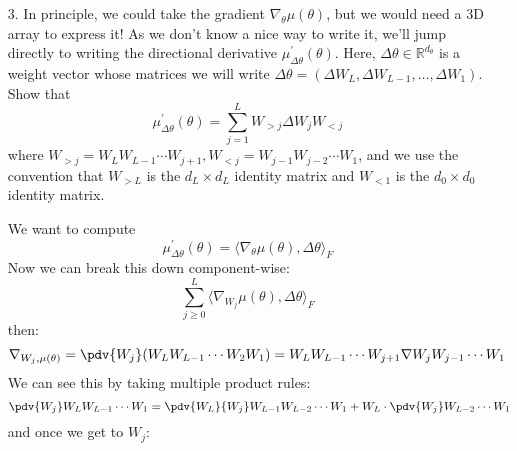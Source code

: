 \documentclass{article}
\begin{document}
\begin{itemize}
                \item [3.] In principle, we could take the gradient $\nabla_{\theta} \mu(\theta)$, but we would need a $3$D array to express it! As we don't know a nice way to write it, we'll jump directly to writing the directional derivative $\mu^{\prime}_{\Delta \theta}(\theta)$. Here, $\Delta\theta \in \mathbb{R}^{d_{\theta}}$ is a weight vector whose matrices we will write $\Delta\theta = (\Delta W_{L}, \Delta W_{L - 1}, \ldots, \Delta W_{1})$. Show that
                    \begin{equation*}
                        \mu^{\prime}_{\Delta\theta}(\theta) = \sum_{j = 1}^{L}W_{ > j} \Delta W_{j}W_{ < j}
                    \end{equation*}
                where $W_{> j} = W_{L}W_{L - 1} \cdots W_{j + 1}, W_{< j} = W_{j - 1}W_{j - 2} \cdots W_{1}$, and we use the convention that $W_{ > L}$ is the $d_{L} \times d_{L}$ identity matrix and $W_{ < 1}$ is the $d_{0} \times d_{0}$ identity matrix.
                    \begin{answer}
                        We want to compute
                            \begin{equation*}
                                \mu^{\prime}_{\Delta\theta}(\theta) = \langle \nabla_{\theta}\mu(\theta), \Delta \theta \rangle_{F}
                            \end{equation*}
                        Now we can break this down component-wise:
                            \begin{equation*}
                                \sum_{j \geq 0}^{L} \langle \nabla_{W_{j}}\mu(\theta), \Delta\theta \rangle_{F}
                            \end{equation*}
                        then:
                            \begin{equation*}
                                \nabla_{W_{j}, \mu(\theta)} = \pdv{W_{j}}(W_{L}W_{L - 1} \cdots W_{2} W_{1}) = W_{L}W_{L - 1} \cdots W_{j + 1} \nabla W_{j} W_{j - 1}\cdots W_{1}
                            \end{equation*}
                        We can see this by taking multiple product rules:
                            \begin{equation*}
                                \pdv{W_{j}} W_{L}W_{L - 1} \cdots W_{1} = \pdv{W_{L}}{W_{j}}W_{L - 1}W_{L - 2}\cdots W_{1} + W_{L} \cdot \pdv{W_{j}} W_{L - 2} \cdots W_{1}
                            \end{equation*}
                        and once we get to $W_{j}$:

\end{answer}
\end{itemize}
\end{document}
